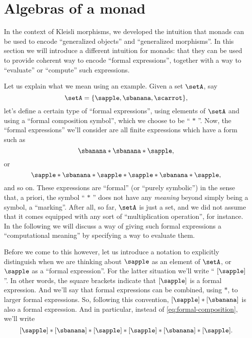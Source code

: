 

\section{Algebras of a monad}
\label{sec:Eilenberg-Moore}

In the context of Kleisli morphisms, we developed the intuition that monads can be used to encode ``generalized objects'' and ``generalized morphisms''. In this section we will introduce a different intuition for monads: that they can be used to provide coherent way to encode ``formal expressions'', together with a way to ``evaluate'' or ``compute'' such expressions. 

Let us explain what we mean using an example. Given a set $\setA$, say
\begin{equation}
\setA = \{ \sapple, \sbanana, \scarrot \},
\end{equation}
let's define a certain type of ``formal expressions'', using elements of $\setA$ and using a ``formal composition symbol'', which we choose to be `` $*$ ''. Now, the ``formal expressions'' we'll consider are all finite expressions which have a form such as 
\begin{equation}\label{eq:formal-composition}
 \sbanana * \sbanana * \sapple,
\end{equation}
or
\begin{equation}\label{eq:formal-composition}
\sapple * \sbanana * \sapple * \sapple * \sbanana * \sapple,
\end{equation}
and so on. 
These expressions are ``formal'' (or ``purely symbolic'') in the sense that, a priori, the symbol `` $*$ '' does not have any \emph{meaning} beyond simply being a symbol, a ``marking''. After all, so far, $\setA$ is just a set, and we did not assume that it comes equipped with any sort of ``multiplication operation'', for instance. In the following we will discuss a way of giving such formal expressions a ``computational meaning'' by specifying a way to evaluate them. 


Before we come to this however, let us introduce a notation to explicitly distinguish when we are thinking about $\sapple$ as an element of $\setA$, or $\sapple$ as a ``formal expression''. For the latter situation we'll write `` $[\sapple]$ ''.
In other words, the square brackets indicate that $[\sapple]$ is a formal expression. And we'll say that formal expressions can be combined, using $*$, to larger formal expressions. So, following this convention, $[\sapple] * [\sbanana]$ is also a formal expression. And in particular, instead of \cref{eq:formal-composition}, we'll write
\begin{equation}\label{eq:formal-composition-bracketed}
[\sapple] * [\sbanana] * [\sapple] * [\sapple] * [\sbanana] * [\sapple].
\end{equation}

